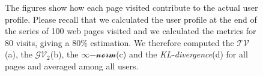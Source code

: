 \begin{figure}
\centering
    \hfil

    \hfil

\caption[Page impact on the actual user's profile]{The figures show how each page visited contribute to the actual user profile. Please recall that we calculated the user profile at the end of the series of 100 web pages visited and we calculated the metrics for 80 visits, giving a 80\% estimation. %
We therefore computed the $\mathcal{TV}$(a), the $\mathcal{GV_2}$(b), the $\infty\mathcal{-norm}$(c) and the \emph{KL-divergence}(d) for all pages and averaged among all users.\label{fig:average-pop-profiles} }%
\end{figure}

